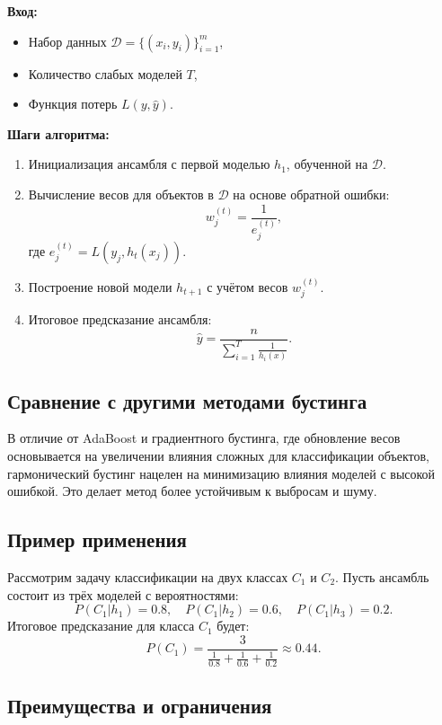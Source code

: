 \textbf{Вход:}
\begin{itemize}
    \item Набор данных \( \mathcal{D} = \{(x_i, y_i)\}_{i=1}^m \),
    \item Количество слабых моделей \( T \),
    \item Функция потерь \( L(y, \hat{y}) \).
\end{itemize}

\textbf{Шаги алгоритма:}
\begin{enumerate}
    \item Инициализация ансамбля с первой моделью \( h_1 \), обученной на \( \mathcal{D} \).
    \item Вычисление весов для объектов в \( \mathcal{D} \) на основе обратной ошибки:
    \[
    w_j^{(t)} = \frac{1}{e_j^{(t)}},
    \]
    где \( e_j^{(t)} = L(y_j, h_t(x_j)) \).
    \item Построение новой модели \( h_{t+1} \) с учётом весов \( w_j^{(t)} \).
    \item Итоговое предсказание ансамбля:
    \[
    \hat{y} = \frac{n}{\sum_{i=1}^T \frac{1}{h_i(x)}}.
    \]
\end{enumerate}

\subsection*{Сравнение с другими методами бустинга}

В отличие от AdaBoost и градиентного бустинга, где обновление весов основывается на увеличении влияния сложных для классификации объектов, гармонический бустинг нацелен на минимизацию влияния моделей с высокой ошибкой. Это делает метод более устойчивым к выбросам и шуму.

\subsection*{Пример применения}

Рассмотрим задачу классификации на двух классах \( C_1 \) и \( C_2 \). Пусть ансамбль состоит из трёх моделей с вероятностями:
\[
P(C_1 | h_1) = 0.8, \quad P(C_1 | h_2) = 0.6, \quad P(C_1 | h_3) = 0.2.
\]
Итоговое предсказание для класса \( C_1 \) будет:
\[
P(C_1) = \frac{3}{\frac{1}{0.8} + \frac{1}{0.6} + \frac{1}{0.2}} \approx 0.44.
\]

\subsection*{Преимущества и ограничения}

